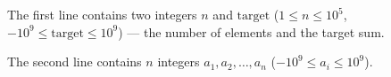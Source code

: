 The first line contains two integers $n$ and $\text{target}$ ($1 \leq n \leq 10^5$, $-10^9 \leq \text{target} \leq 10^9$) --- the number of elements and the target sum.

The second line contains $n$ integers $a_1, a_2, \ldots, a_n$ ($-10^9 \leq a_i \leq 10^9$).
